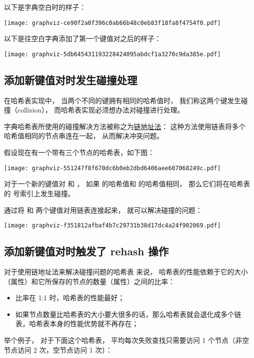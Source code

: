 \documentclass[a4paper,11pt,english]{sphinxmanual}
\begin{document}
以下是字典空白时的样子：

\texttt{[image: graphviz-ce90f2a0f396c0ab66b48c0eb83f18fa8f4754f0.pdf]}

以下是往空白字典添加了第一个键值对之后的样子：

\texttt{[image: graphviz-5db645431193228424095abdcf1a3270c9da385e.pdf]}


\subsection{添加新键值对时发生碰撞处理}
\label{internal-datastruct/dict:id11}
在哈希表实现中，
当两个不同的键拥有相同的哈希值时，
我们称这两个键发生碰撞（collision），
而哈希表实现必须想办法对碰撞进行处理。

字典哈希表所使用的碰撞解决方法被称之为\href{http://en.wikipedia.org/wiki/Hash\_table\#Separate\_chaining}{链地址法}：
这种方法使用链表将多个哈希值相同的节点串连在一起，
从而解决冲突问题。

假设现在有一个带有三个节点的哈希表，如下图：

\texttt{[image: graphviz-551247f8f670dc6b0eb2dbd6406aee607068249c.pdf]}

对于一个新的键值对  和  ，
如果  的哈希值和  的哈希值相同，
那么它们将在哈希表的  号索引上发生碰撞。

通过将  和  两个键值对用链表连接起来，
就可以解决碰撞的问题：

\texttt{[image: graphviz-f351812afbaf4b7c29731b38d17dc4a24f902069.pdf]}


\subsection{添加新键值对时触发了 rehash 操作}
\label{internal-datastruct/dict:rehash}
对于使用链地址法来解决碰撞问题的哈希表  来说，
哈希表的性能依赖于它的大小（属性）和它所保存的节点的数量（属性）之间的比率：
\begin{itemize}
\item {} 
比率在 1:1 时，哈希表的性能最好；

\item {} 
如果节点数量比哈希表的大小要大很多的话，那么哈希表就会退化成多个链表，哈希表本身的性能优势就不再存在；

\end{itemize}

举个例子，
对于下面这个哈希表，
平均每次失败查找只需要访问 1 个节点（非空节点访问 2 次，空节点访问 1 次）：
\end{document}
